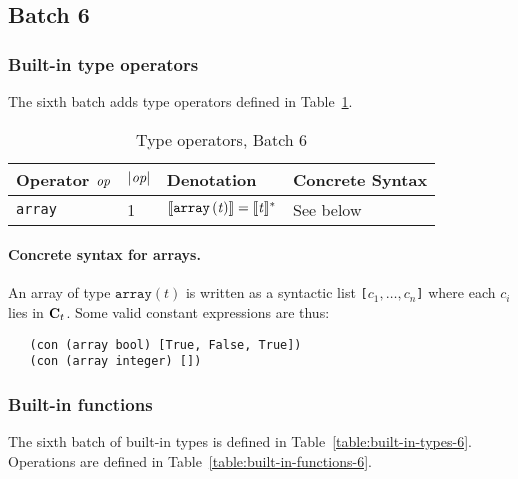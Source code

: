 \renewcommand{\note}[1]{
  \bigskip
  \refstepcounter{notenumberF}
  \noindent\textbf{Note \thenotenumberF. #1}
}
\newpage
\subsection{Batch 6}
\label{sec:default-builtins-6}

\subsubsection{Built-in type operators}
\label{sec:built-in-type-operators-6}
The sixth batch adds type operators defined in Table~\ref{table:built-in-type-operators-6}. 

\begin{table}[H]
  \centering
    \begin{tabular}{|l|p{14mm}|l|l|}
        \hline
        Operator $\textit{op}$ & $\left|\textit{op}\right|$  & Denotation & Concrete Syntax\\
        \hline
        \texttt{array} 
          & 1 
          & $\llbracket\mathit{\mathtt{array}\,\mathtt{(}t\mathtt{)}}\rrbracket = \llbracket\mathit{t}\rrbracket^*$ 
          & See below\\
        \hline
        \end{tabular}
   \caption{Type operators, Batch 6}
    \label{table:built-in-type-operators-6}
\end{table}

\paragraph{Concrete syntax for arrays.}
An array of type $\texttt{array}(t)$ is written as a syntactic list
\texttt{[$c_1, \ldots, c_n$]} where each $c_i$ lies in $\mathbf{C}_t$.
Some valid constant expressions are thus:
\begin{verbatim}
   (con (array bool) [True, False, True])
   (con (array integer) [])
\end{verbatim}

\subsubsection{Built-in functions}
\label{sec:built-in-functions-6}
The sixth batch of built-in types is defined in Table~\ref{table:built-in-types-6}.
Operations are defined in Table~\ref{table:built-in-functions-6}.

